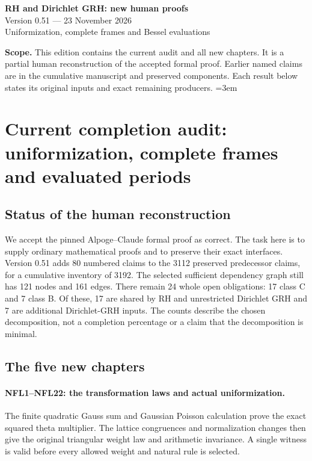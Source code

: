 \documentclass[11pt,a4paper]{article}
\numberwithin{equation}{section}
\theoremstyle{remark}\newtheorem{remark}[theorem]{Remark}
\begin{document}
\begin{center}
{\LARGE\bfseries RH and Dirichlet GRH: new human proofs}\\[7pt]
{\large Version 0.51 --- 23 November 2026}\\[5pt]
{\large Uniformization, complete frames and Bessel evaluations}
\end{center}
\textbf{Scope.} This edition contains the current audit and all new chapters.
It is a partial human reconstruction of the accepted formal proof.
Earlier named claims are in the cumulative manuscript and preserved components.
Each result below states its original inputs and exact remaining producers.
\setcounter{tocdepth}{1}
\tableofcontents
\clearpage
\begingroup\emergencystretch=3em
\section{Current completion audit: uniformization, complete frames and evaluated periods}
\label{sec:dependency-audit-v51}

\subsection{Status of the human reconstruction}

We accept the pinned Alpoge--Claude formal proof as correct. The task
here is to supply ordinary mathematical proofs and to preserve their
exact interfaces. Version 0.51 adds 80 numbered claims to the
3112 preserved predecessor claims, for a cumulative inventory of
3192. The selected sufficient dependency graph still has 121 nodes
and 161 edges. There remain 24 whole open obligations: 17 class C
and 7 class B. Of these, 17 are shared by RH and unrestricted
Dirichlet GRH and 7 are additional Dirichlet-GRH inputs.
The counts describe the chosen decomposition, not a completion
percentage or a claim that the decomposition is minimal.

\subsection{The five new chapters}

\paragraph{NFL1--NFL22: the transformation laws and actual uniformization.}
The finite quadratic Gauss sum and Gaussian Poisson calculation prove
the exact squared theta multiplier. The lattice congruences and
normalization changes then give the original triangular weight law
and arithmetic invariance. A single witness is valid before every
allowed weight and natural rule is selected.
\end{document}
